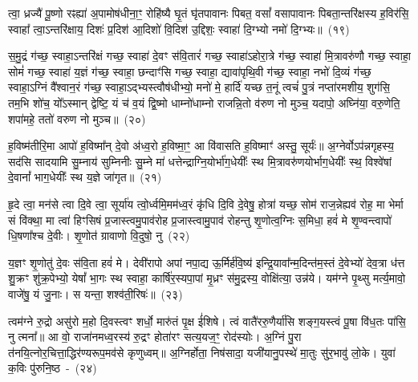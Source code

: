 त्वा॒ ध्रज्यै॑ पू॒ष्णो रꣴह्या॑ अ॒पामोष॑धीना॒ꣳ॒ रोहि॑ष्यै घृ॒तं घृ॑तपावानः पिबत॒ वसां᳚ वसापावानः पिबता॒न्त\-रि॑क्षस्य ह॒विर॑सि॒ स्वाहा᳚ त्वा॒\-ऽन्तरि॑क्षाय॒ दिशः॑ प्र॒दिश॑ आ॒दिशो॑ वि॒दिश॑ उ॒द्दिशः॒ स्वाहा॑ दि॒ग्भ्यो नमो॑ दि॒ग्भ्यः॥~(१९)\ip

{\anuvakamend[{वात॑स्या॒ष्टाविꣳ॑शतिश्च}]}%

स॒मु॒द्रं ग॑च्छ॒ स्वाहा॒\-ऽन्तरि॑क्षं गच्छ॒ स्वाहा॑ दे॒वꣳ स॑वि॒तारं॑ गच्छ॒ स्वाहा॑\-ऽहोरा॒त्रे ग॑च्छ॒ स्वाहा॑ मि॒त्रावरु॑णौ गच्छ॒ स्वाहा॒ सोमं॑ गच्छ॒ स्वाहा॑ य॒ज्ञं ग॑च्छ॒ स्वाहा॒ छन्दाꣳ॑सि गच्छ॒ स्वाहा॒ द्यावा॑\-पृथि॒वी ग॑च्छ॒ स्वाहा॒ नभो॑ दि॒व्यं ग॑च्छ॒ स्वाहा॒\-ऽग्निं वै᳚श्वान॒रं ग॑च्छ॒ स्वाहा॒\-ऽद्भ्यस्त्वौष॑धीभ्यो॒ मनो॑ मे॒ हार्दि॑ यच्छ त॒नूं त्वचं॑ पु॒त्रं नप्ता॑रमशीय॒ शुग॑सि॒ तम॒भि शो॑च॒ यो᳚\-ऽस्मान् द्वेष्टि॒ यं च॑ व॒यं द्वि॒ष्मो धाम्नो॑धाम्नो राजन्नि॒तो व॑रुण नो मुञ्च॒ यदापो॒ अघ्नि॑या॒ वरु॒णेति॒ शपा॑महे॒ ततो॑ वरुण नो मुञ्च॥~(२०)\ip

{\anuvakamend[{अ॒सि॒ षड्विꣳ॑शतिश्च}]}%

ह॒विष्म॑तीरि॒मा आपो॑ ह॒विष्मा᳚न् दे॒वो अ॑ध्व॒रो ह॒विष्मा॒ꣳ॒ आ वि॑वासति ह॒विष्माꣳ॑ अस्तु॒ सूर्यः॑॥ अ॒ग्नेर्वो\-ऽप॑न्नगृहस्य॒ सद॑सि सादयामि सु॒म्नाय॑ सुम्निनीः सु॒म्ने मा॑ धत्तेन्द्राग्नि॒योर्भा॑ग॒धेयीः᳚ स्थ मि॒त्रावरु॑णयोर्भाग॒\-धेयीः᳚ स्थ॒ विश्वे॑षां दे॒वानां᳚ भाग॒\-धेयीः᳚ स्थ य॒ज्ञे जा॑गृत॥~(२१)\ip

{\anuvakamend[{ह॒विष्म॑ती॒श्चतु॑स्रिꣳशत्}]}%

हृ॒दे त्वा॒ मन॑से त्वा दि॒वे त्वा॒ सूर्या॑य त्वो॒र्ध्वमि॒मम॑ध्व॒रं कृ॑धि दि॒वि दे॒वेषु॒ होत्रा॑ यच्छ॒ सोम॑ राज॒न्नेह्यव॑ रोह॒ मा भेर्मा सं वि॑क्था॒ मा त्वा॑ हिꣳसिषं प्र॒जास्त्वमु॒पाव॑रोह प्र॒जास्त्वामु॒पाव॑ रोहन्तु शृ॒णोत्व॒ग्निः स॒मिधा॒ हवं॑ मे शृ॒ण्वन्त्वापो॑ धि॒षणा᳚श्च दे॒वीः। शृ॒णोत॑ ग्रावाणो वि॒दुषो॒ नु~(२२)\ip

य॒ज्ञꣳ शृ॒णोतु॑ दे॒वः स॑वि॒ता हवं॑ मे। देवी॑रापो अपां नपा॒द्य ऊ॒र्मिर्\mbox{}ह॑वि॒ष्य॑ इन्द्रि॒यावा᳚न्म॒दिन्त॑म॒स्तं दे॒वेभ्यो॑ देव॒त्रा ध॑त्त शु॒क्रꣳ शु॑क्र॒पेभ्यो॒ येषां᳚ भा॒गः स्थ स्वाहा॒ कार्\mbox{}षि॑र॒स्यपा॒पां मृ॒ध्रꣳ स॑मु॒द्रस्य॒ वोक्षि॑त्या॒ उन्न॑ये। यम॑ग्ने पृ॒थ्सु मर्त्य॒मावो॒ वाजे॑षु॒ यं जु॒नाः। स यन्ता॒ शश्व॑ती॒रिषः॑॥~(२३)\ip

{\anuvakamend[{नु स॒प्तच॑त्वारिꣳशच्च}]}%

त्वम॑ग्ने रु॒द्रो असु॑रो म॒हो दि॒वस्त्वꣳ शर्धो॒ मारु॑तं पृ॒क्ष ई॑शिषे। त्वं वातै॑ररु॒णैर्या॑सि शङ्ग॒यस्त्वं पू॒षा वि॑ध॒तः पा॑सि॒ नु त्मना᳚॥ आ वो॒ राजा॑नमध्व॒रस्य॑ रु॒द्रꣳ होता॑रꣳ सत्य॒यज॒ꣳ॒ रोद॑स्योः। अ॒ग्निं पु॒रा त॑नयि॒त्नोर॒चित्ता॒द्धिर॑ण्यरूप॒मव॑से कृणुध्वम्॥ अ॒ग्निर्\mbox{}होता॒ निष॑सादा॒ यजी॑यानु॒पस्थे॑ मा॒तुः सु॑र॒भावु॑ लो॒के। युवा॑ क॒विः पु॑रुनि॒ष्ठ~-~(२४)\ip

